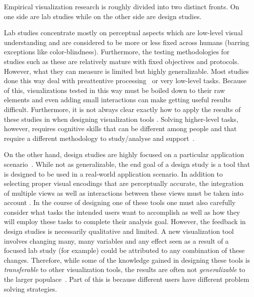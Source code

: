 
Empirical visualization research is roughly divided into two distinct fronts.
On one side are lab studies while on the other side are design studies.

Lab studies concentrate mostly on perceptual aspects which are low-level visual
understanding and are considered to be more or less fixed across humans
(barring exceptions like color-blindness). Furthermore, the testing
methodologies for studies such as these are relatively mature with fixed
objectives and protocols. However, what they can measure is limited but highly
generalizable. Most studies done this way deal with preattentive 
processing~\citep{McGrath:1995} or
very low-level tasks. Because of this, visualizations tested in this way must be
boiled down to their raw elements and even adding small interactions can make
getting useful results difficult.  Furthermore, it is not always clear exactly
how to apply the results of these studies in when designing visualization
tools  . 
Solving higher-level tasks, however, requires cognitive 
skills that can be different among people and that require a different 
methodology to study/analyse and support~\citep{Frensch:2005}.

On the other hand, design studies are highly focused on a particular
application scenario~\citep{Sedlmair:2012}. While not as generalizable, the end goal of a design
study is a tool that is designed to be used in a real-world application
scenario. In addition to selecting proper visual encodings that are
perceptually accurate, the integration of multiple views as well as
interactions between these views must be taken into account
. In the course of
designing one of these tools one must also carefully consider what tasks the
intended users want to accomplish as well as how they will employ these tasks
to complete their analysis goal. However, the feedback in design studies is
necessarily qualitative and limited. A new visualization tool involves changing
many, many variables and any effect seen as a result of a focused lab study
(for example) could be attributed to any combination of these changes.
Therefore, while some of the knowledge gained in designing these tools is
\emph{transferable} to other visualization tools, the results are often not
\emph{generalizable} to the larger populace~.
Part of this is because different
users have different problem solving strategies. 

